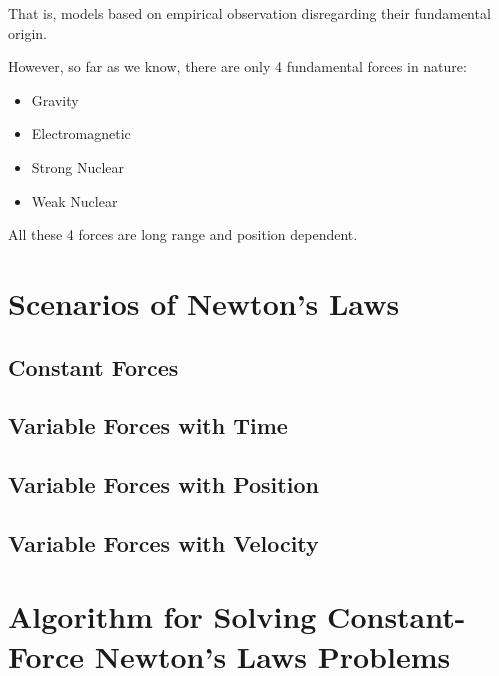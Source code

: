 That is, models based on empirical observation disregarding their fundamental origin.

However, so far as we know, there are only 4 fundamental forces in nature:

\begin{itemize}
	\item Gravity
	\item Electromagnetic
	\item Strong Nuclear
	\item Weak Nuclear
\end{itemize}

All these 4 forces are long range and position dependent.

\section{Scenarios of Newton's Laws}

\subsection{Constant Forces}

\subsection{Variable Forces with Time}

\subsection{Variable Forces with Position}

\subsection{Variable Forces with Velocity}

\section{Algorithm for Solving Constant-Force Newton's Laws Problems}

